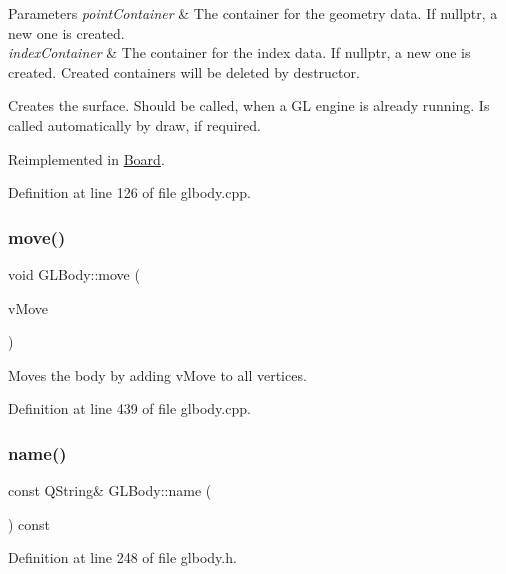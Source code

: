 \begin{DoxyParams}{Parameters}
{\em point\+Container} & The container for the geometry data. If nullptr, a new one is created. \\
\hline
{\em index\+Container} & The container for the index data. If nullptr, a new one is created. Created containers will be deleted by destructor.\\
\hline
\end{DoxyParams}
Creates the surface. Should be called, when a GL engine is already running. Is called automatically by draw, if required. 

Reimplemented in \mbox{\hyperlink{class_board_a4a8568ce7d13db61b01e6bf14e7b12fd}{Board}}.



Definition at line 126 of file glbody.\+cpp.

\mbox{\label{class_g_l_body_aa716fdbc46e14434e28b893dad1b87f1}} 
\subsubsection{\texorpdfstring{move()}{move()}}
{\footnotesize\ttfamily void G\+L\+Body\+::move (\begin{DoxyParamCaption}\item[{Q\+Vector3D}]{v\+Move }\end{DoxyParamCaption})}

Moves the body by adding v\+Move to all vertices. 

Definition at line 439 of file glbody.\+cpp.

\mbox{\label{class_g_l_body_af9f19479127cf12562fa0a2f9b5276f4}} 
\subsubsection{\texorpdfstring{name()}{name()}}
{\footnotesize\ttfamily const Q\+String\& G\+L\+Body\+::name (\begin{DoxyParamCaption}{ }\end{DoxyParamCaption}) const\hspace{0.3cm}{\ttfamily [inline]}}



Definition at line 248 of file glbody.\+h.

